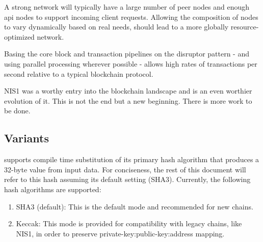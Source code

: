 A strong network will typically have a large number of peer nodes and enough api nodes to support incoming client requests.
Allowing the composition of nodes to vary dynamically based on real needs, should lead to a more globally resource-optimized network.

Basing the core block and transaction pipelines on the disruptor pattern - and using parallel processing wherever possible - allows high rates of transactions per second relative to a typical blockchain protocol.

NIS1 was a worthy entry into the blockchain landscape and \codenamespace is an even worthier evolution of it.
This is not the end but a new beginning.
There is more work to be done.

\subsection{Variants}

\codenamespace supports compile time substitution of its primary hash algorithm that produces a 32-byte value from input data.
For conciseness, the rest of this document will refer to this hash assuming its default setting (SHA3).
Currently, the following hash algorithms are supported:

\begin{enumerate}
\item SHA3 (default): This is the default mode and recommended for new chains.
\item Keccak: This mode is provided for compatibility with legacy chains, like NIS1, in order to preserve private-key:public-key:address mapping.
\end{enumerate}

